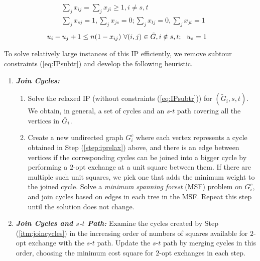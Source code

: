 %
\begin{equation} \label{eq:IPnodeblnce}
  \begin{aligned}
    & \sum\nolimits_{j} x_{ij} = \sum\nolimits_{j} x_{ji} \geq 1, i \neq s,t \\
    & \sum\nolimits_{j} x_{sj} = 1,\sum\nolimits_{j} x_{js} = 0;
      \sum\nolimits_{j} x_{tj} = 0,\sum\nolimits_{j} x_{jt} = 1
  \end{aligned}
\end{equation}
%
\begin{equation} \label{eq:IPsubtr}
  \begin{aligned}
    & u_i - u_j + 1 \leq n(1-x_{ij})~\forall (i,j) \in \tilde{G}, i \notin{s,t};~~ u_s = 1
  \end{aligned}
\end{equation}


To solve relatively large instances of this IP efficiently, we remove subtour constraints (\ref{eq:IPsubtr}) and develop the following heuristic.
\begin{enumerate}
  \item\label{itm:joincycles}
    {\it {\bfseries Join Cycles:}}
    \begin{enumerate}
     \item \label{step:iprelax} Solve the relaxed IP (without constraints (\ref{eq:IPsubtr})) for $(\tilde{G}_i, s, t)$.
       We obtain, in general, a set of cycles and an $s$-$t$ path covering all the vertices in $\tilde{G}_i$.
       
     \item Create a new undirected graph $G_i^c$ where each vertex represents a cycle obtained in Step (\ref{step:iprelax}) above, and there is an edge between vertices if the corresponding cycles can be joined into a bigger cycle by performing a $2$-opt exchange \cite{ApBiChCo2007} at a unit square between them.
       If there are multiple such unit squares, we pick one that adds the minimum weight to the joined cycle.
       Solve a {\it minimum spanning forest} (MSF) problem on $G_i^c$, and join cycles based on edges in each tree in the MSF.
       Repeat this step until the solution does not change.
    \end{enumerate}

  \item \label{itm:joincyclesandpath}
    {\it {\bfseries Join Cycles and $s$-$t$ Path:}}
    Examine the cycles created by Step (\ref{itm:joincycles}) in the increasing order of numbers of squares available for $2$-opt exchange with the $s$-$t$ path.
    Update the $s$-$t$ path by merging cycles in this order, choosing the minimum cost square for $2$-opt exchanges in each step.
\end{enumerate}

